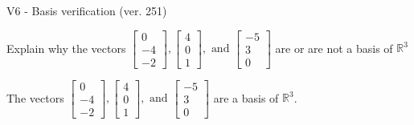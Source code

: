 \begin{exercise}
  \begin{exerciseTitle}V6 - Basis verification (ver. 251)\end{exerciseTitle}
  \begin{exerciseStatement}
    Explain why the vectors \(\left[\begin{array}{r}
0 \\
-4 \\
-2
\end{array}\right] , \left[\begin{array}{r}
4 \\
0 \\
1
\end{array}\right] , \text{ and } \left[\begin{array}{r}
-5 \\
3 \\
0
\end{array}\right]\) are or are not a basis of \(\mathbb{R}^3\)	


  \end{exerciseStatement}
  \begin{exerciseAnswer}
   The vectors \(\left[\begin{array}{r}
0 \\
-4 \\
-2
\end{array}\right] , \left[\begin{array}{r}
4 \\
0 \\
1
\end{array}\right] , \text{ and } \left[\begin{array}{r}
-5 \\
3 \\
0
\end{array}\right]\) 
  	 are  a basis of \(\mathbb{R}^3\).
  


  \end{exerciseAnswer}
\end{exercise}